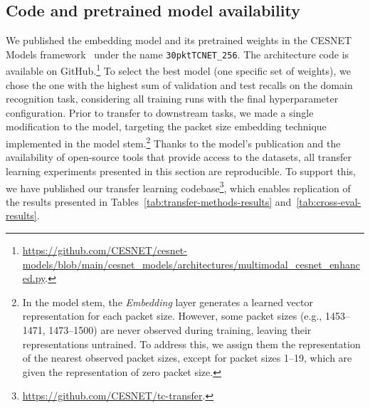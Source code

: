 \documentclass[lettersize,journal,twoside,article]{IEEEtran}
\begin{document}
\subsection{Code and pretrained model availability}
We published the embedding model and its pretrained weights in the CESNET Models framework~\cite{Luxemburk2024_CesnetModels} under the name \texttt{30pktTCNET\_256}. The architecture code is available on GitHub.\footnote{\url{https://github.com/CESNET/cesnet-models/blob/main/cesnet_models/architectures/multimodal_cesnet_enhanced.py}.} To select the best model (one specific set of weights), we chose the one with the highest sum of validation and test recalls on the domain recognition task, considering all training runs with the final hyperparameter configuration. Prior to transfer to downstream tasks, we made a single modification to the model, targeting the packet size embedding technique implemented in the model stem.\footnote{In the model stem, the \textit{Embedding} layer generates a learned vector representation for each packet size. However, some packet sizes (e.g., 1453--1471, 1473--1500) are never observed during training, leaving their representations untrained. To address this, we assign them the representation of the nearest observed packet sizes, except for packet sizes 1--19, which are given the representation of zero packet size.} Thanks to the model's publication and the availability of open-source tools that provide access to the datasets, all transfer learning experiments presented in this section are reproducible. To support this, we have published our transfer learning codebase\footnote{\url{https://github.com/CESNET/tc-transfer}.}, which enables replication of the results presented in Tables~\ref{tab:transfer-methods-results} and~\ref{tab:cross-eval-results}.
\end{document}

